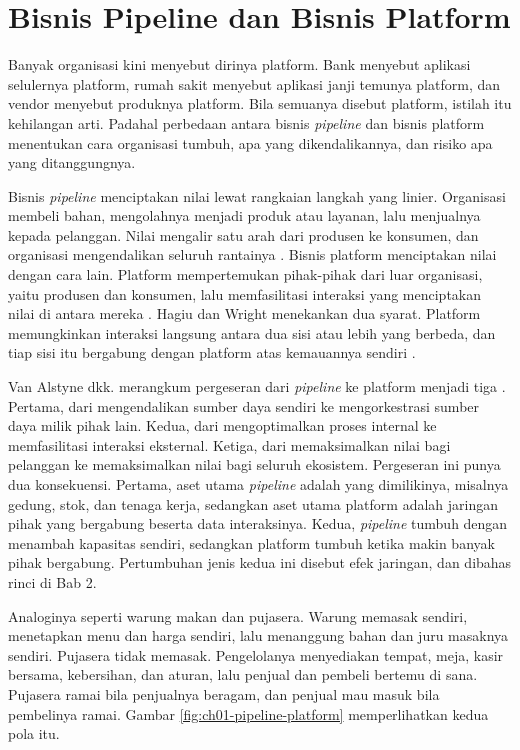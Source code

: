 \section{Bisnis Pipeline dan Bisnis Platform}

Banyak organisasi kini menyebut dirinya platform. Bank menyebut aplikasi
selulernya platform, rumah sakit menyebut aplikasi janji temunya platform, dan
vendor menyebut produknya platform. Bila semuanya disebut platform, istilah itu
kehilangan arti. Padahal perbedaan antara bisnis \textit{pipeline} dan bisnis
platform menentukan cara organisasi tumbuh, apa yang dikendalikannya, dan risiko
apa yang ditanggungnya.

Bisnis \textit{pipeline} menciptakan nilai lewat rangkaian langkah yang linier.
Organisasi membeli bahan, mengolahnya menjadi produk atau layanan, lalu
menjualnya kepada pelanggan. Nilai mengalir satu arah dari produsen ke konsumen,
dan organisasi mengendalikan seluruh rantainya \cite{c01-vanalstyne2016pipelines}.
Bisnis platform menciptakan nilai dengan cara lain. Platform mempertemukan
pihak-pihak dari luar organisasi, yaitu produsen dan konsumen, lalu memfasilitasi
interaksi yang menciptakan nilai di antara mereka \cite{parker2016platform}.
Hagiu dan Wright menekankan dua syarat. Platform memungkinkan interaksi langsung
antara dua sisi atau lebih yang berbeda, dan tiap sisi itu bergabung dengan
platform atas kemauannya sendiri \cite{hagiu2015multisided}.

Van Alstyne dkk. merangkum pergeseran dari \textit{pipeline} ke platform menjadi
tiga \cite{c01-vanalstyne2016pipelines}. Pertama, dari mengendalikan sumber daya
sendiri ke mengorkestrasi sumber daya milik pihak lain. Kedua, dari
mengoptimalkan proses internal ke memfasilitasi interaksi eksternal. Ketiga, dari
memaksimalkan nilai bagi pelanggan ke memaksimalkan nilai bagi seluruh
ekosistem. Pergeseran ini punya dua konsekuensi. Pertama, aset utama
\textit{pipeline} adalah yang dimilikinya, misalnya gedung, stok, dan tenaga
kerja, sedangkan aset utama platform adalah jaringan pihak yang bergabung beserta
data interaksinya. Kedua, \textit{pipeline} tumbuh dengan menambah kapasitas
sendiri, sedangkan platform tumbuh ketika makin banyak pihak bergabung.
Pertumbuhan jenis kedua ini disebut efek jaringan, dan dibahas rinci di Bab 2.

Analoginya seperti warung makan dan pujasera. Warung memasak sendiri, menetapkan
menu dan harga sendiri, lalu menanggung bahan dan juru masaknya sendiri.
Pujasera tidak memasak. Pengelolanya menyediakan tempat, meja, kasir bersama,
kebersihan, dan aturan, lalu penjual dan pembeli bertemu di sana. Pujasera ramai
bila penjualnya beragam, dan penjual mau masuk bila pembelinya ramai.
Gambar \ref{fig:ch01-pipeline-platform} memperlihatkan kedua pola itu.

